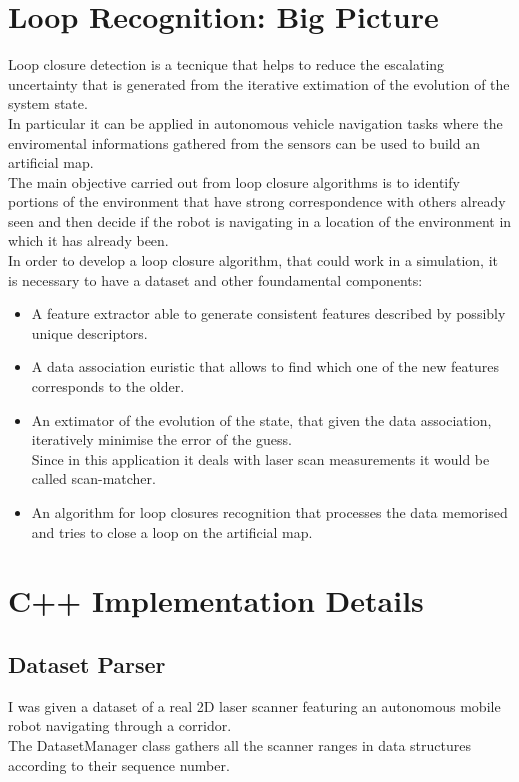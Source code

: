 \section{Loop Recognition:  Big Picture}

Loop closure detection is a tecnique that helps to reduce the escalating
uncertainty that is generated from the iterative extimation of the evolution
of the system state.\\ In particular it can be applied
in autonomous vehicle navigation tasks where the enviromental informations
gathered from the sensors can be used to build an artificial map.\\
The main objective carried out from loop closure algorithms is to identify
portions of the environment that have strong correspondence with others
already seen and then decide if the robot is navigating in a location of
the environment in which it has already  been.\\
In order to develop a loop closure algorithm, that could work in a
simulation, it is necessary to have a dataset and other foundamental components:
\begin{itemize}
  \item A feature extractor able to generate consistent features described
    by possibly unique descriptors.
   \item A data association euristic that allows to find which one of the
     new features corresponds to the older.
   \item An extimator of the evolution of the state, that given the data
     association, iteratively minimise the error of the guess.\\
     Since in this application it deals with laser scan measurements
     it would be called scan-matcher.
     \item An algorithm for loop closures recognition that processes the
       data memorised and tries to close a loop on the artificial map.
\end{itemize}

\section{ C++ Implementation Details}
\subsection{ Dataset Parser}
I was given a dataset of a real 2D laser scanner featuring an autonomous
mobile robot navigating through a corridor.\\ The DatasetManager
class gathers all the scanner ranges in data structures according
to their sequence number.
